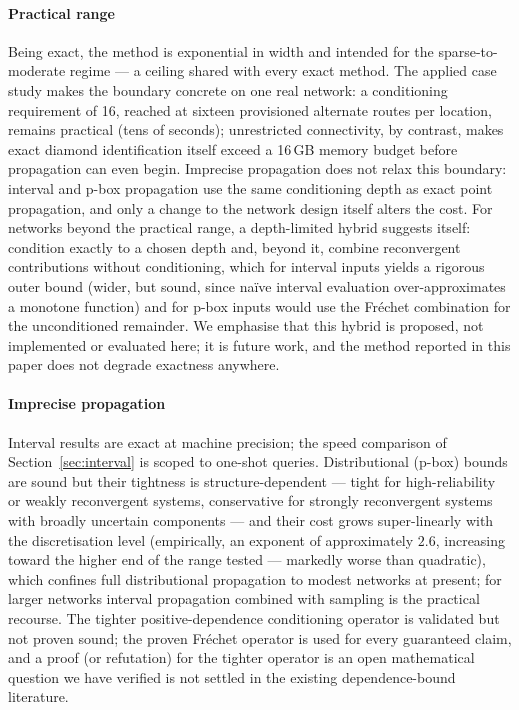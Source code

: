 \documentclass[preprint,12pt]{elsarticle}
\theoremstyle{definition}
\begin{document}
\paragraph{Practical range} Being exact, the method is exponential in width and intended for the
sparse-to-moderate regime --- a ceiling shared with every exact method. The applied case study makes the
boundary concrete on one real network: a conditioning requirement of 16, reached at sixteen
provisioned alternate routes per location, remains practical (tens of seconds); unrestricted connectivity,
by contrast, makes exact diamond identification itself exceed a 16\,GB memory budget before propagation
can even begin. Imprecise propagation does not relax this boundary:
interval and p-box propagation use the same conditioning depth as exact point propagation, and only a
change to the network design itself alters the cost. For networks beyond the practical range, a
depth-limited hybrid suggests itself: condition exactly to a chosen depth and, beyond it, combine
reconvergent contributions without conditioning, which for interval inputs yields a rigorous outer bound
(wider, but sound, since na\"ive interval evaluation over-approximates a monotone function) and for
p-box inputs would use the Fr\'echet combination for the unconditioned remainder. We emphasise that this
hybrid is proposed, not implemented or evaluated here; it is future work, and the method reported in
this paper does not degrade exactness anywhere.

\paragraph{Imprecise propagation} Interval results are exact at machine precision; the speed comparison
of Section~\ref{sec:interval} is scoped to one-shot queries. Distributional (p-box) bounds are sound but
their tightness is structure-dependent --- tight for high-reliability or weakly reconvergent systems,
conservative for strongly reconvergent systems with broadly uncertain components --- and their cost
grows super-linearly with the discretisation level (empirically, an exponent of approximately $2.6$,
increasing toward the higher end of the range tested --- markedly worse than quadratic), which confines
full distributional propagation to
modest networks at present; for larger networks interval propagation combined with sampling is the
practical recourse. The tighter positive-dependence conditioning operator is validated but not proven
sound; the proven Fr\'echet operator is used for every guaranteed claim, and a proof (or refutation) for
the tighter operator is an open mathematical question we have verified is not settled in the existing
dependence-bound literature.
\end{document}
